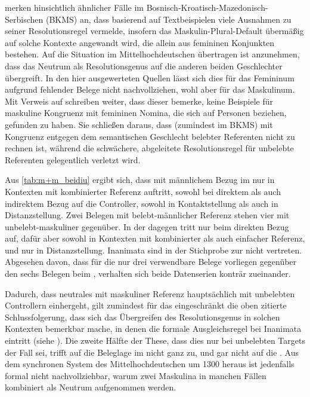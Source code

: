 \textcites[581]{wechsler2009}[190]{wechslerzlatic2003} merken hinsichtlich
ähnlicher Fälle im
Bosnisch-\allowbreak{}Kroatisch-\allowbreak{}Mazedonisch-\allowbreak{}Serbischen
(BKMS) an, dass \citet{corbett1983,corbett1991} basierend auf Textbeispielen
viele Ausnahmen zu seiner Resolutionsregel vermelde, insofern das
Maskulin-Plural-Default übermäßig auf solche Kontexte angewandt wird, die
allein aus femininen Konjunkten bestehen. Auf die Situation im
Mittelhochdeutschen übertragen ist anzunehmen, dass das Neutrum als
Resolutionsgenus auf die anderen beiden Geschlechter übergreift. In den hier
ausgewerteten Quellen lässt sich dies für das Femininum aufgrund fehlender
Belege nicht nachvollziehen, wohl aber für das Maskulinum. Mit Verweis auf
\citet[302]{corbett1991} schreiben
\textcites[581]{wechsler2009}[190]{wechslerzlatic2003} weiter, dass dieser
bemerke, keine Beispiele für maskuline Kongruenz mit femininen Nomina, die sich
auf Personen beziehen, gefunden zu haben. Sie schließen daraus, dass (zumindest
im BKMS) mit Kongruenz entgegen dem semantischen Geschlecht belebter Referenten
nicht zu rechnen ist, während die schwächere, abgeleitete Resolutionsregel für
unbelebte Referenten gelegentlich verletzt wird.

Aus \cref{tab:m+m_beidiu} ergibt sich, dass  mit männlichem Bezug
im \CAO{} nur in Kontexten mit kombinierter Referenz auftritt, sowohl
bei direktem als auch indirektem Bezug auf die Controller, sowohl in
Kontaktstellung als auch in Distanzstellung. Zwei Belegen mit belebt-männlicher
Referenz stehen vier mit unbelebt-maskuliner gegenüber. In der \KC{}
dagegen tritt  nur beim direkten Bezug auf, dafür aber sowohl in
Kontexten mit kombinierter als auch einfacher Referenz, und nur in
Distanzstellung. Inanimata sind in der Stichprobe zur \KC{} nicht
vertreten. Abgesehen davon, dass für die \KC{} nur drei verwendbare
Belege vorliegen gegenüber den sechs Belegen beim \CAO{}, verhalten
sich beide Datenserien konträr zueinander.

Dadurch, dass neutrales  mit maskuliner Referenz hauptsächlich mit
unbelebten Controllern einhergeht, gilt zumindest für das \CAO{}
eingeschränkt die oben zitierte Schlussfolgerung, dass sich das Übergreifen des
Resolutionsgenus in solchen Kontexten bemerkbar mache, in denen die formale
Ausgleichsregel bei Inanimata eintritt (siehe ). Die
zweite Hälfte der These, dass dies nur bei unbelebten Targets der Fall sei,
trifft auf die Beleglage im \CAO{} nicht ganz zu, und gar nicht auf
die \KC{}. Aus dem synchronen System des Mittelhochdeutschen um 1300
heraus ist jedenfalls formal nicht nachvollziehbar, warum zwei Maskulina in
manchen Fällen kombiniert als Neutrum aufgenommen werden.

